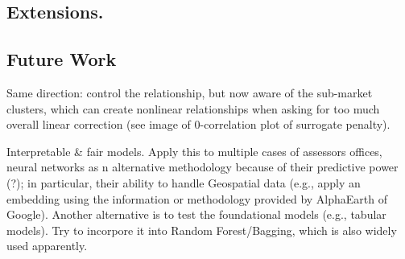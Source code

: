 \documentclass[12pt, draft]{article}
\theoremstyle{plain}
\theoremstyle{definition}
\newcommand{\1}{\mathbf{1}}
\begin{document}
{\begin{itemize}
\end{itemize}





\subsection{Extensions.}


\subsection{Future Work}

Same direction: control the relationship, but now aware of the sub-market clusters, which can create nonlinear relationships when asking for too much overall linear correction (see image of 0-correlation plot of surrogate penalty).

Interpretable \& fair models. Apply this to multiple cases of assessors offices, neural networks as n alternative methodology because of their predictive power (?); in particular, their ability to handle Geospatial data (e.g., apply an embedding using the information or methodology provided by AlphaEarth of Google). Another alternative is to test the foundational models (e.g., tabular models). Try to incorpore it into Random Forest/Bagging, which is also widely used apparently.








}
\end{document}
